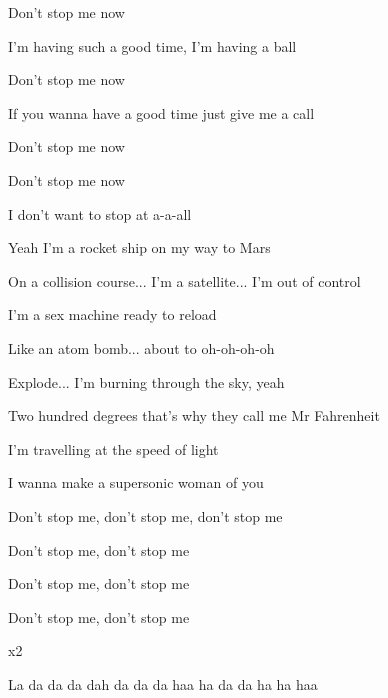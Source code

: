 \begin{song}
\begin{chorusbox}{\PrechorusAndChorus}
\bigskip

Don’t stop me now \par
I’m having such a good time, I’m having a ball \par
{}Don’t stop me now \par
If you wanna have a good time just give me a call \par
{}Don’t stop me now \par
\hspace{120pt}  \par
{}Don’t stop me now \par
\hspace{120pt}  \par
I don’t want to stop at a-a-all
\end{chorusbox}

\bigskip

Yeah I’m a rocket ship on my way to Mars \par
On a collision course... I’m a satellite... I’m out of control \par
I’m a sex machine ready to reload \par
Like an atom bomb... about to oh-oh-oh-oh \par

\bigskip

Explode... I’m burning through the sky, yeah \par
Two hundred degrees that’s why they call me Mr Fahrenheit \par
I’m travelling at the speed of light \par
I wanna make a supersonic woman of you \par

\bigskip

 \par
Don’t stop me, don’t stop me, don’t stop me  \par
Don’t stop me, don’t stop me  \par
Don’t stop me, don’t stop me  \par
Don’t stop me, don’t stop me  \par
{}     x2 \par

\bigskip

\PrechorusAndChorus \par

\bigskip

 La da da da dah da da da haa ha da da ha ha haa  \par

\end{song}
